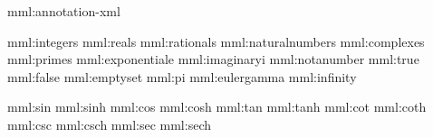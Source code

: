 \startxmlsetups mml:annotation-xml
\stopxmlsetups


\startxmlsetups mml:integers       \integers              \stopxmlsetups
\startxmlsetups mml:reals          \reals                 \stopxmlsetups
\startxmlsetups mml:rationals      \rationals             \stopxmlsetups
\startxmlsetups mml:naturalnumbers \naturalnumbers        \stopxmlsetups
\startxmlsetups mml:complexes      \complexes             \stopxmlsetups
\startxmlsetups mml:primes         \primes                \stopxmlsetups
\startxmlsetups mml:exponentiale        \stopxmlsetups
\startxmlsetups mml:imaginaryi          \stopxmlsetups
\startxmlsetups mml:notanumber        \stopxmlsetups
\startxmlsetups mml:true             \stopxmlsetups
\startxmlsetups mml:false           \stopxmlsetups
\startxmlsetups mml:emptyset            \stopxmlsetups
\startxmlsetups mml:pi             \pi                    \stopxmlsetups
\startxmlsetups mml:eulergamma     \gamma                 \stopxmlsetups
\startxmlsetups mml:infinity       \infty                 \stopxmlsetups


\setupMMLappearance[function][\c!reduction=\v!yes]



\startxmlsetups  mml:sin      \stopxmlsetups
\startxmlsetups  mml:sinh     \stopxmlsetups
\startxmlsetups  mml:cos      \stopxmlsetups
\startxmlsetups  mml:cosh     \stopxmlsetups
\startxmlsetups  mml:tan      \stopxmlsetups
\startxmlsetups  mml:tanh     \stopxmlsetups
\startxmlsetups  mml:cot      \stopxmlsetups
\startxmlsetups  mml:coth     \stopxmlsetups
\startxmlsetups  mml:csc      \stopxmlsetups
\startxmlsetups  mml:csch     \stopxmlsetups
\startxmlsetups  mml:sec      \stopxmlsetups
\startxmlsetups  mml:sech     \stopxmlsetups

